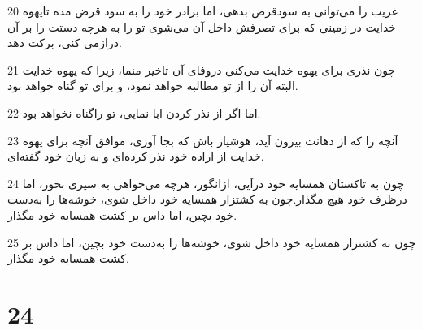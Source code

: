 \par 20 غریب را می‌توانی به سودقرض بدهی، اما برادر خود را به سود قرض مده تایهوه خدایت در زمینی که برای تصرفش داخل آن می‌شوی تو را به هر‌چه دستت را بر آن درازمی کنی، برکت دهد.
\par 21 چون نذری برای یهوه خدایت می‌کنی دروفای آن تاخیر منما، زیرا که یهوه خدایت البته آن را از تو مطالبه خواهد نمود، و برای تو گناه خواهد بود.
\par 22 اما اگر از نذر کردن ابا نمایی، تو راگناه نخواهد بود.
\par 23 آنچه را که از دهانت بیرون آید، هوشیار باش که بجا آوری، موافق آنچه برای یهوه خدایت از اراده خود نذر کرده‌ای و به زبان خود گفته‌ای.
\par 24 چون به تاکستان همسایه خود درآیی، ازانگور، هر‌چه می‌خواهی به سیری بخور، اما درظرف خود هیچ مگذار.چون به کشتزار همسایه خود داخل شوی، خوشه‌ها را به‌دست خود بچین، اما داس بر کشت همسایه خود مگذار.
\par 25 چون به کشتزار همسایه خود داخل شوی، خوشه‌ها را به‌دست خود بچین، اما داس بر کشت همسایه خود مگذار.
 
\chapter{24}


